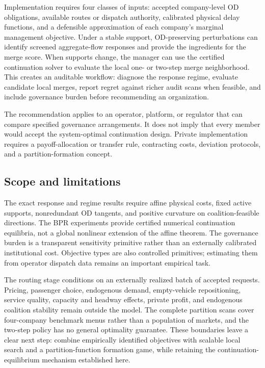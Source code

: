 Implementation requires four classes of inputs: accepted company-level OD
obligations, available routes or dispatch authority, calibrated physical delay
functions, and a defensible approximation of each company's marginal
management objective. Under a stable support, OD-preserving perturbations can
identify screened aggregate-flow responses and provide the ingredients for the
merge score. When supports change, the manager can use the certified
continuation solver to evaluate the local one- or two-step merge neighborhood.
This creates an auditable workflow: diagnose the response regime, evaluate
candidate local merges, report regret against richer audit scans when feasible,
and include governance burden before recommending an organization.

The recommendation applies to an operator, platform, or regulator that can
compare specified governance arrangements. It does not imply that every member
would accept the system-optimal continuation design. Private implementation
requires a payoff-allocation or transfer rule, contracting costs, deviation
protocols, and a partition-formation concept.

\subsection{Scope and limitations}

The exact response and regime results require affine physical costs, fixed
active supports, nonredundant OD tangents, and positive curvature on
coalition-feasible directions. The BPR experiments provide certified numerical
continuation equilibria, not a global nonlinear extension of the affine
theorem. The governance burden is a transparent sensitivity primitive rather
than an externally calibrated institutional cost. Objective types are also
controlled primitives; estimating them from operator dispatch data remains an
important empirical task.

The routing stage conditions on an externally realized batch of accepted
requests. Pricing, passenger choice, endogenous demand, empty-vehicle
repositioning, service quality, capacity and headway effects, private profit,
and endogenous coalition stability remain outside the model. The complete
partition scans cover four-company benchmark menus rather than a population of
markets, and the two-step policy has no general optimality guarantee. These
boundaries leave a clear next step: combine empirically identified objectives
with scalable local search and a partition-function formation game, while
retaining the continuation-equilibrium mechanism established here.
